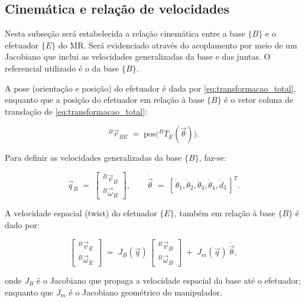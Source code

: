 \subsection{Cinemática e relação de velocidades}
\label{sec:cinematica_velocidades}

Nesta subseção será estabelecida a relação cinemática entre a base $\{B\}$ e o efetuador $\{E\}$ do MR. Será evidenciado através do acoplamento por meio de um Jacobiano que inclui as velocidades generalizadas da base e das juntas. O referencial utilizado é o da base $\{B\}$.

A pose (orientação e posição) do efetuador é dada por \eqref{eq:transformacao_total}, enquanto que a posição do efetuador em relação à base $\{B\}$ é o vetor coluna de translação de \eqref{eq:transformacao_total}:

\begin{equation}
\label{eq:rBE}
{}^{B}\vec r_{BE} \;=\; \text{pos}\big({}^{B}T_{E}(\vec\theta)\big).
\end{equation}

Para definir as velocidades generalizadas da base $\{B\}$, faz-se:

\begin{equation}
\label{eq:nu_base}
\dot{\vec q}_B \;=\;
\begin{bmatrix}
{}^{B}\vec v_B \\[2pt]
{}^{B}\vec \omega_B
\end{bmatrix},
\qquad
\dot{\vec\theta} \;=\; [\,\dot\theta_1,\dot\theta_2,\dot\theta_3,\dot\theta_4,\dot d_5\,]^T.
\end{equation}

A velocidade espacial (twist) do efetuador $\{E\}$, também em relação à base $\{B\}$ é dado por:

\begin{equation}
\label{eq:twist_coupled}
\begin{bmatrix}
{}^{B}\vec v_E \\[2pt]
{}^{B}\vec \omega_E
\end{bmatrix}
\;=\;
J_B(\vec q)\,
\begin{bmatrix}
{}^{B}\vec v_B \\[2pt]
{}^{B}\vec \omega_B
\end{bmatrix}
\;+\;
J_m(\vec q)\,\dot{\vec\theta},
\end{equation}

onde $J_B$ é o Jacobiano que propaga a velocidade espacial da base até o efetuador; enquanto que $J_m$ é o Jacobiano geométrico do manipulador.

